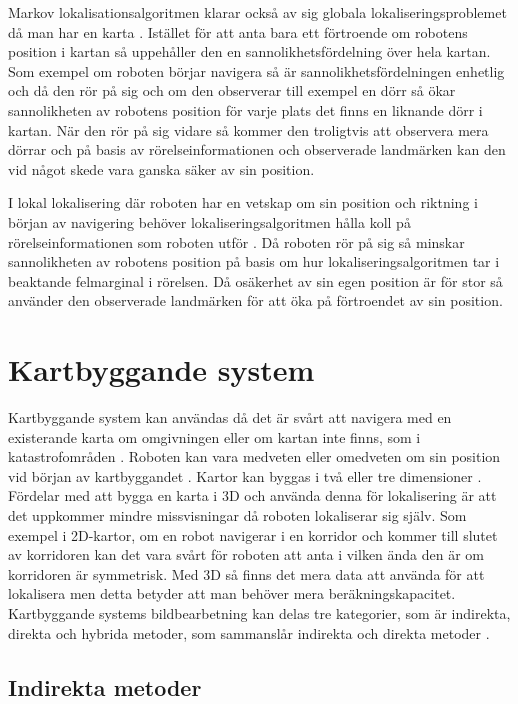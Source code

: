 Markov lokalisationsalgoritmen klarar också av sig globala lokaliseringsproblemet då man har en karta \citep{ProbabilisticRobotics}. Istället för att anta bara ett förtroende om robotens position i kartan så uppehåller den en sannolikhetsfördelning över hela kartan. Som exempel om roboten börjar navigera så är sannolikhetsfördelningen enhetlig och då den rör på sig och om den observerar till exempel en dörr så ökar sannolikheten av robotens position för varje plats det finns en liknande dörr i kartan. När den rör på sig vidare så kommer den troligtvis att observera mera dörrar och på basis av rörelseinformationen och observerade landmärken kan den vid något skede vara ganska säker av sin position.

I lokal lokalisering där roboten har en vetskap om sin position och riktning i början av navigering behöver lokaliseringsalgoritmen hålla koll på rörelseinformationen som roboten utför \citep{montecarlo,ProbabilisticRobotics}. Då roboten rör på sig så minskar sannolikheten av robotens position på basis om hur lokaliseringsalgoritmen tar i beaktande felmarginal i rörelsen. Då osäkerhet av sin egen position är för stor så använder den observerade landmärken för att öka på förtroendet av sin position. 

\section{Kartbyggande system}

Kartbyggande system kan användas då det är svårt att navigera med en existerande karta om omgivningen eller om kartan inte finns, som i katastrofområden \citep{geospatial}. Roboten kan vara medveten eller omedveten om sin position vid början av kartbyggandet \citep{globalsubmaps}. Kartor kan byggas i två eller tre dimensioner \citep{ProbabilisticRobotics}. Fördelar med att bygga en karta i 3D och använda denna för lokalisering är att det uppkommer mindre missvisningar då roboten lokaliserar sig själv. Som exempel i 2D-kartor, om en robot navigerar i en korridor och kommer till slutet av korridoren kan det vara svårt för roboten att anta i vilken ända den är om korridoren är symmetrisk. Med 3D så finns det mera data att använda för att lokalisera men detta betyder att man behöver mera beräkningskapacitet. Kartbyggande systems bildbearbetning kan delas tre kategorier, som är indirekta, direkta och hybrida metoder, som sammanslår indirekta och direkta metoder \citep{geospatial}.

\subsection{Indirekta metoder}

